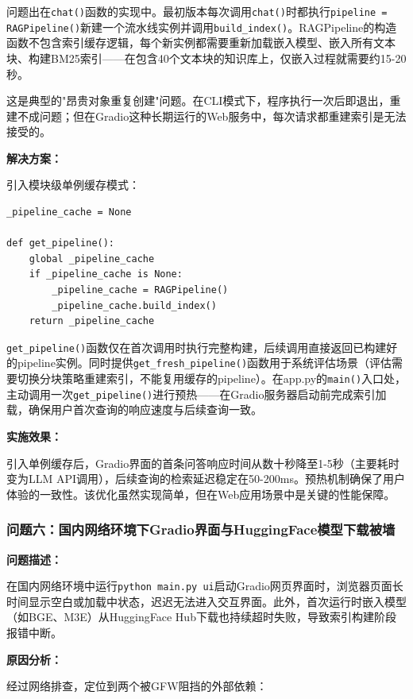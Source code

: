 \documentclass[10pt,a4paper]{article}
\begin{document}
问题出在\texttt{chat()}函数的实现中。最初版本每次调用\texttt{chat()}时都执行\texttt{pipeline = RAGPipeline()}新建一个流水线实例并调用\texttt{build\_index()}。RAGPipeline的构造函数不包含索引缓存逻辑，每个新实例都需要重新加载嵌入模型、嵌入所有文本块、构建BM25索引——在包含40个文本块的知识库上，仅嵌入过程就需要约15-20秒。

这是典型的"昂贵对象重复创建"问题。在CLI模式下，程序执行一次后即退出，重建不成问题；但在Gradio这种长期运行的Web服务中，每次请求都重建索引是无法接受的。

\textbf{解决方案：}

引入模块级单例缓存模式：

\begin{verbatim}
_pipeline_cache = None

def get_pipeline():
    global _pipeline_cache
    if _pipeline_cache is None:
        _pipeline_cache = RAGPipeline()
        _pipeline_cache.build_index()
    return _pipeline_cache
\end{verbatim}

\texttt{get\_pipeline()}函数仅在首次调用时执行完整构建，后续调用直接返回已构建好的pipeline实例。同时提供\texttt{get\_fresh\_pipeline()}函数用于系统评估场景（评估需要切换分块策略重建索引，不能复用缓存的pipeline）。在app.py的\texttt{main()}入口处，主动调用一次\texttt{get\_pipeline()}进行预热——在Gradio服务器启动前完成索引加载，确保用户首次查询的响应速度与后续查询一致。

\textbf{实施效果：}

引入单例缓存后，Gradio界面的首条问答响应时间从数十秒降至1-5秒（主要耗时变为LLM API调用），后续查询的检索延迟稳定在50-200ms。预热机制确保了用户体验的一致性。该优化虽然实现简单，但在Web应用场景中是关键的性能保障。

\subsubsection{问题六：国内网络环境下Gradio界面与HuggingFace模型下载被墙}

\textbf{问题描述：}

在国内网络环境中运行\texttt{python main.py ui}启动Gradio网页界面时，浏览器页面长时间显示空白或加载中状态，迟迟无法进入交互界面。此外，首次运行时嵌入模型（如BGE、M3E）从HuggingFace Hub下载也持续超时失败，导致索引构建阶段报错中断。

\textbf{原因分析：}

经过网络排查，定位到两个被GFW阻挡的外部依赖：
\end{document}
